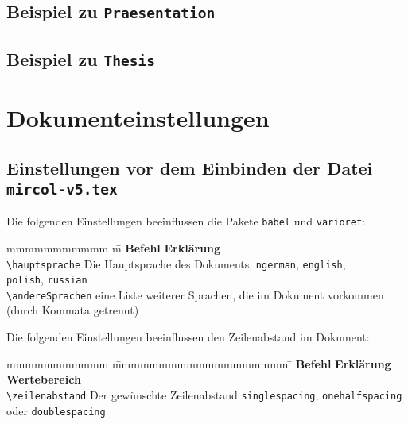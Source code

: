 		\begin{center}
			\vspace*{20em}
			\subsection{Beispiel zu \texttt{Praesentation}}
		\end{center}
		\newpage


		\begin{center}
			\vspace*{20em}
			\subsection{Beispiel zu \texttt{Thesis}}
		\end{center}
		\label{thesis-bsp}
		\newpage



	\section{Dokumenteinstellungen}
		\subsection{Einstellungen vor dem Einbinden der Datei \texttt{mircol-v5.tex}}
			Die folgenden Einstellungen beeinflussen die Pakete \texttt{babel} und \texttt{varioref}:
			\begin{tabbing}
				mmmmmmmmmmm 			\= m \kill
				\textbf{Befehl}			\> \textbf{Erklärung} \\
				\verb|\hauptsprache|	\> Die Hauptsprache des Dokuments, \zb \verb|ngerman|, \verb|english|, \\
										\> \verb|polish|, \verb|russian|  \\
				\verb|\andereSprachen|	\> eine Liste weiterer Sprachen, die im Dokument vorkommen \\
										\> (durch Kommata getrennt)
			\end{tabbing}
			Die folgenden Einstellungen beeinflussen den Zeilenabstand im Dokument:
			\begin{tabbing}
				mmmmmmmmmmm 			\= mmmmmmmmmmmmmmmmmmm \= \kill
				\textbf{Befehl}			\> \textbf{Erklärung}			\> \textbf{Wertebereich} \\
				\verb|\zeilenabstand|	\> Der gewünschte Zeilenabstand \> \texttt{singlespacing}, \texttt{onehalfspacing} \\
										\>								\> oder \texttt{doublespacing}
			\end{tabbing}

